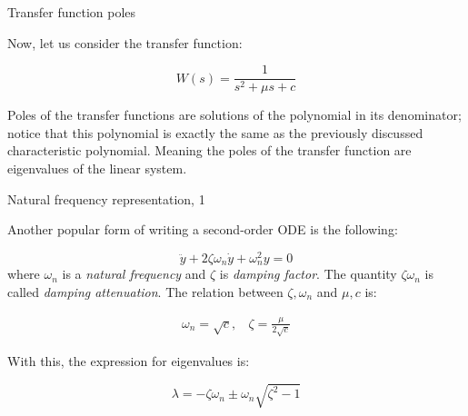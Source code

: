 \documentclass{beamer}
\begin{document}
\begin{frame}{Transfer function poles}
	\begin{flushleft}
		
		Now, let us consider the transfer function:
		
		\begin{equation}
			W(s) = \frac{1}{s^2 + \mu s + c }
		\end{equation}
		
		Poles of the transfer functions are solutions of the polynomial in its denominator; notice that this polynomial is exactly the same as the previously discussed characteristic polynomial. Meaning the poles of the transfer function are eigenvalues of the linear system.
		
		
	\end{flushleft}
\end{frame}



\begin{frame}{Natural frequency representation, 1}
	\begin{flushleft}
		
		Another popular form of writing a second-order ODE is the following:
		
		\begin{equation}
			\ddot y + 2 \zeta \omega_n \dot y + \omega_n^2 y = 0
		\end{equation}
		where $\omega_n$ is a \emph{natural frequency} and $\zeta$ is \emph{damping factor}. The quantity $\zeta \omega_n$ is called \emph{damping attenuation}. The relation between $\zeta, \omega_n$ and $\mu, c$ is:
		
		\begin{align}
			\omega_n = \sqrt{c},  \ \ \ \ \zeta = \frac{\mu}{2\sqrt{c}}
		\end{align}
	
		With this, the expression for eigenvalues is:
		
		\begin{equation}
			\lambda = -\zeta \omega_n \pm \omega_n \sqrt{\zeta^2 - 1}
		\end{equation}
		
	\end{flushleft}
\end{frame}
\end{document}
